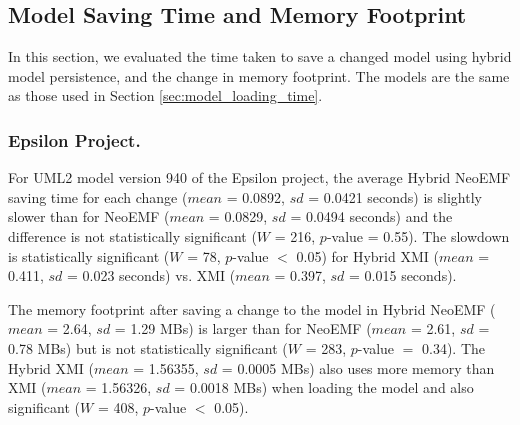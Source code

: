 \documentclass{llncs}
\begin{document}
\subsection{Model Saving Time and Memory Footprint}
\label{sec:model_saving_time}

In this section, we evaluated the time taken to save a changed model using hybrid model persistence, and the change in memory footprint. The models are the same as those used in Section \ref{sec:model_loading_time}.

\subsubsection{Epsilon Project.}
\label{sec:model_saving_time_epsilon}
For UML2 model version 940 of the Epsilon project, the average Hybrid NeoEMF saving time for each change ($mean$ = 0.0892, $sd$ = 0.0421 seconds) is slightly slower than for NeoEMF ($mean$ = 0.0829, $sd$ = 0.0494 seconds) and the difference is not statistically significant ($W$ = 216, $p$-value = 0.55). The slowdown is statistically significant ($W$ = 78, $p$-value $<$ 0.05) for Hybrid XMI ($mean$ = 0.411, $sd$ = 0.023 seconds) vs. XMI ($mean$ = 0.397, $sd$ = 0.015 seconds). 

The memory footprint after saving a change to the model in Hybrid NeoEMF ($mean$ = 2.64, $sd$ = 1.29 MBs) is larger than for NeoEMF ($mean$ = 2.61, $sd$ = 0.78 MBs) but is not statistically significant ($W$ = 283, $p$-value $=$ 0.34). The Hybrid XMI ($mean$ = 1.56355, $sd$ = 0.0005 MBs) also uses more memory than XMI ($mean$ = 1.56326, $sd$ = 0.0018 MBs) when loading the model and also significant ($W$ = 408, $p$-value $<$ 0.05). 
\end{document}
